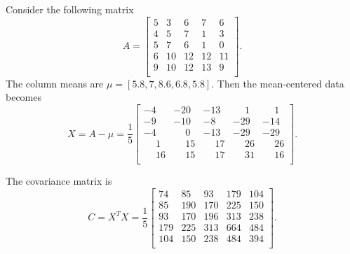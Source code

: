 \begin{example}
    \def\Amat{\begin{bmatrix}
        5 &  3 &  6 &  7 &  6 \\
        4 &  5 &  7 &  1 &  3 \\
        5 &  7 &  6 &  1 &  0 \\
        6 & 10 & 12 & 12 & 11 \\
        9 & 10 & 12 & 13 &  9 \\
    \end{bmatrix}}
    Consider the following matrix \[A = \Amat.\]
    The column means are \(\mu = [5.8,7,8.6,6.8,5.8]\).
    Then the mean-centered data becomes
    \def\-{\phantom{-}}
    \[X = A - \mu = \frac{1}{5}\begin{bmatrix}
            -4 &   -20 &   -13 &   \-1 &   \-1 \\
            -9 &   -10 &    -8 &   -29 &   -14 \\
            -4 &   \-0 &   -13 &   -29 &   -29 \\
            \-1 &  \-15 &  \-17 &  \-26 &  \-26 \\
        \-16 &  \-15 &  \-17 &  \-31 &  \-16 \\
    \end{bmatrix}.\]

    The covariance matrix is
    \[C = X^TX = \frac{1}{5}\begin{bmatrix}
            74 &  85 &  93 & 179 & 104 \\
            85 & 190 & 170 & 225 & 150 \\
            93 & 170 & 196 & 313 & 238 \\
        179 & 225 & 313 & 664 & 484 \\
        104 & 150 & 238 & 484 & 394 \\
    \end{bmatrix}.\]
    

\end{example}

